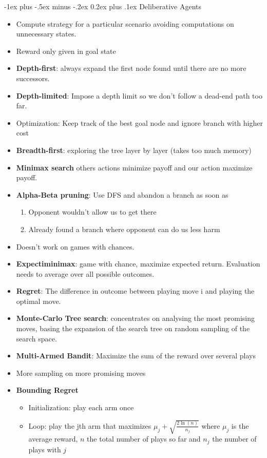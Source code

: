 \documentclass[10pt,a4paper,landscape]{article}
\makeatletter
\renewcommand{\section}{\@startsection{section}{1}{0mm}%
                                {-1ex plus -.5ex minus -.2ex}%
                                {0.2ex plus .1ex}%
                                {\normalfont\tiny\bfseries}}
\makeatother
\begin{document}
\begin{multicols*}{5}
\section{Deliberative Agents}
\begin{itemize}
	\item Compute strategy for a particular scenario avoiding computations on unnecessary states.
	\item Reward only given in goal state
	\item \textbf{Depth-first}: always expand the first node found until there are no more successors.
	\item \textbf{Depth-limited}: Impose a depth limit so we don't follow a dead-end path too far.
	\item Optimization: Keep track of the best goal node and ignore branch with higher cost
	\item \textbf{Breadth-first}: exploring the tree layer by layer (takes too much memory)
	\item \textbf{Minimax search} others actions minimize payoff and our action maximize payoff.
	\item \textbf{Alpha-Beta pruning}: Use DFS and abandon a branch as soon as
	\begin{enumerate}
		\item Opponent wouldn't allow us to get there
		\item Already found a branch where opponent can do us less harm
	\end{enumerate}
	\item Doesn't work on games with chances.
	\item \textbf{Expectiminimax}: game with chance, maximize expected return. Evaluation needs to average over all possible outcomes.
	\item \textbf{Regret}: The difference in outcome between playing move i and playing the optimal move.
	\item \textbf{Monte-Carlo Tree search}: concentrates on analysing the most promising moves, basing the expansion of the search tree on random sampling of the search space.
	\item \textbf{Multi-Armed Bandit}: Maximize the sum of the reward over several plays
	\item More sampling on more promising moves
	\item \textbf{Bounding Regret}
	\begin{itemize}
		\item Initialization: play each arm once
		\item Loop: play the jth arm that maximizes $\mu_j + \sqrt{\frac{2 \ln(n)}{n_j}}$
		where $\mu_j$ is the average reward, $n$ the total number of plays so far and $n_j$ the number of plays with $j$
	\end{itemize}
\end{itemize}


\end{multicols*}
\end{document}
